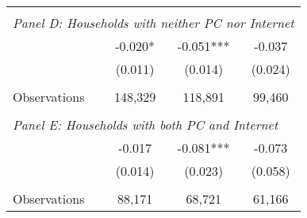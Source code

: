 {\begin{tabular}{lccc}
&  &  &   \\
\multicolumn{4}{l}{\textit{Panel D: Households with neither PC nor Internet}} \\
\hspace{3mm}        &      -0.020*  &      -0.051***&      -0.037   \\
                    &     (0.011)   &     (0.014)   &     (0.024)   \\
                    &               &               &               \\
\hspace{3mm}Observations&     148,329   &     118,891   &      99,460   \\
 
&  &  &   \\
\multicolumn{4}{l}{\textit{Panel E: Households with both PC and Internet}} \\
\hspace{3mm}        &      -0.017   &      -0.081***&      -0.073   \\
                    &     (0.014)   &     (0.023)   &     (0.058)   \\
                    &               &               &               \\
\hspace{3mm}Observations&      88,171   &      68,721   &      61,166   \\
 

\bottomrule
\end{tabular}
}
